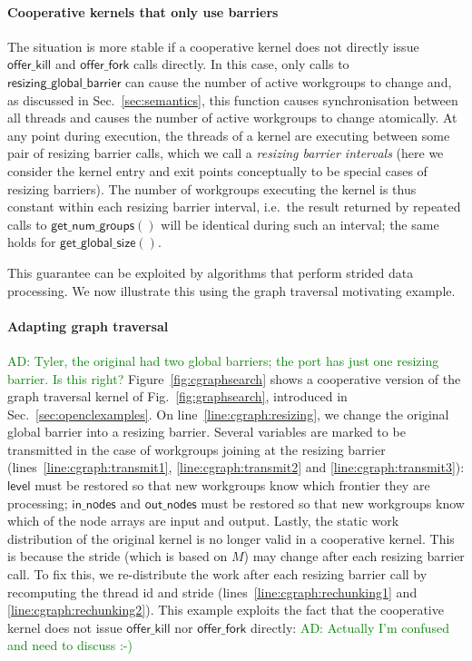 \documentclass[numbers,nocopyrightspace,10pt]{sigplanconf}
\newcommand{\ADComment}[1]{\textcolor{green}{AD: #1}}
\newcommand{\myfig}{Fig.~}
\newcommand{\myfiglong}{Figure~}
\newcommand{\mysec}{Sec.~}
\newcommand{\offerfork}{\mathsf{offer\_fork}}
\newcommand{\offerkill}{\mathsf{offer\_kill}}
\newcommand{\resizingglobalbarrier}{\mathsf{resizing\_global\_barrier}}
\newcommand{\getnumgroups}{\mathsf{get\_num\_groups}}
\newcommand{\getglobalsize}{\mathsf{get\_global\_size}}
\newcommand{\keyword}[1]{\mathsf{#1}}
\begin{document}
\paragraph{Cooperative kernels that only use barriers}

The situation is more stable if a cooperative kernel does not directly
issue $\offerkill$ and $\offerfork$ calls directly.  In this case,
only calls to $\resizingglobalbarrier$ can cause the number of active
workgroups to change and, as discussed in \mysec\ref{sec:semantics},
this function causes synchronisation between all threads and causes
the number of active workgroups to change atomically.  At any point
during execution, the threads of a kernel are executing between some
pair of resizing barrier calls, which we call a \emph{resizing barrier
  intervals} (here we consider the kernel entry and exit points
conceptually to be special cases of resizing barriers).  The number of
workgroups executing the kernel is thus constant within each resizing
barrier interval, i.e.\ the result returned by repeated calls to
$\getnumgroups()$ will be identical during such an interval; the same holds for $\getglobalsize()$.

This guarantee can be exploited by algorithms that perform strided
data processing.  We now illustrate this using the graph traversal motivating example.

\paragraph{Adapting graph traversal} \ADComment{Tyler, the original had two global barriers; the port has just one resizing barrier.  Is this right?}
\myfiglong\ref{fig:cgraphsearch} shows a cooperative version of the graph traversal kernel
of \myfig\ref{fig:graphsearch}, introduced in
\mysec\ref{sec:openclexamples}.  
On line~\ref{line:cgraph:resizing}, we change the original global barrier
into a resizing barrier. Several variables are marked to be
transmitted in the case of workgroups joining at the resizing barrier
(lines~\ref{line:cgraph:transmit1}, \ref{line:cgraph:transmit2} and
\ref{line:cgraph:transmit3}): $\keyword{level}$ must be restored so that
new workgroups know which frontier they are processing; $\keyword{in\_nodes}$ and $\keyword{out\_nodes}$ must be restored so that new
workgroups know which of the node arrays are input and output. Lastly,
the static work distribution of the original kernel is no longer valid
in a cooperative kernel. This is because the stride (which is based on
$M$) may change after each resizing barrier
call. To fix this, we re-distribute the work after each resizing
barrier call by recomputing the thread id and stride
(lines~\ref{line:cgraph:rechunking1} and
\ref{line:cgraph:rechunking2}).  This example exploits the fact that the cooperative kernel does not issue $\offerkill$ nor $\offerfork$ directly: \ADComment{Actually I'm confused and need to discuss :-)}
\end{document}
